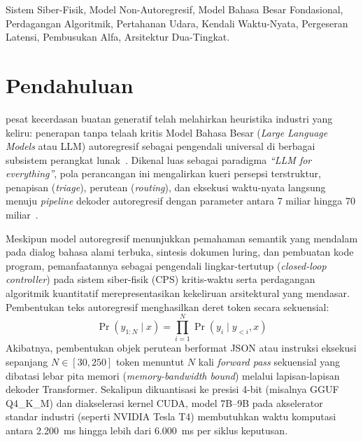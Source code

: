 \documentclass[journal,compsoc]{IEEEtran}
\begin{document}
{\begin{abstract}
sementara model keputusan sub-detik mendominasi rentang 50--300 ms---dan membuktikan mengapa API cloud decision mengungguli LLM lokal 8B akibat hambatan bus memori sekuensial. Terakhir, kami merumuskan Arsitektur Kognitif Dua-Tingkat (\textit{Decoupled Two-Tier Cognitive Architecture}) yang menyatukan penapisan refleks deterministik sub-100ms (Sistem 1) dengan penalaran strategis asinkron di luar jalur kritis (Sistem 2).
\end{abstract}

\begin{IEEEkeywords}
Sistem Siber-Fisik, Model Non-Autoregresif, Model Bahasa Besar Fondasional, Perdagangan Algoritmik, Pertahanan Udara, Kendali Waktu-Nyata, Pergeseran Latensi, Pembusukan Alfa, Arsitektur Dua-Tingkat.
\end{IEEEkeywords}}

\maketitle
\IEEEdisplaynontitleabstractindextext
\IEEEpeerreviewmaketitle

\section{Pendahuluan}
 pesat kecerdasan buatan generatif telah melahirkan heuristika industri yang keliru: penerapan tanpa telaah kritis Model Bahasa Besar (\textit{Large Language Models} atau LLM) autoregresif sebagai pengendali universal di berbagai subsistem perangkat lunak~\cite{achiam2023gpt4}. Dikenal luas sebagai paradigma \textit{``LLM for everything''}, pola perancangan ini mengalirkan kueri persepsi terstruktur, penapisan (\textit{triage}), perutean (\textit{routing}), dan eksekusi waktu-nyata langsung menuju \textit{pipeline} dekoder autoregresif dengan parameter antara 7 miliar hingga 70 miliar~\cite{touvron2023llama}.

Meskipun model autoregresif menunjukkan pemahaman semantik yang mendalam pada dialog bahasa alami terbuka, sintesis dokumen luring, dan pembuatan kode program, pemanfaatannya sebagai pengendali lingkar-tertutup (\textit{closed-loop controller}) pada sistem siber-fisik (CPS) kritis-waktu serta perdagangan algoritmik kuantitatif merepresentasikan kekeliruan arsitektural yang mendasar. Pembentukan teks autoregresif menghasilkan deret token secara sekuensial:
\begin{equation}
\Pr(y_{1:N} \mid x) = \prod_{i=1}^{N} \Pr(y_i \mid y_{<i}, x)
\end{equation}
Akibatnya, pembentukan objek perutean berformat JSON atau instruksi eksekusi sepanjang $N \in [30, 250]$ token menuntut $N$ kali \textit{forward pass} sekuensial yang dibatasi lebar pita memori (\textit{memory-bandwidth bound}) melalui lapisan-lapisan dekoder Transformer. Sekalipun dikuantisasi ke presisi 4-bit (misalnya GGUF Q4\_K\_M) dan diakselerasi kernel CUDA, model 7B--9B pada akselerator standar industri (seperti NVIDIA Tesla T4) membutuhkan waktu komputasi antara 2.200~ms hingga lebih dari 6.000~ms per siklus keputusan.
\end{document}
